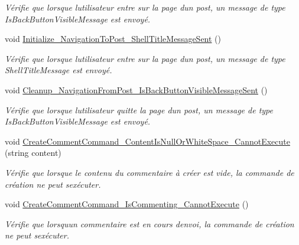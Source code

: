 \begin{DoxyCompactItemize}
\begin{DoxyCompactList}\small\item\em Vérifie que lorsque l\textquotesingle{}utilisateur entre sur la page d\textquotesingle{}un post, un message de type Is\+Back\+Button\+Visible\+Message est envoyé. \end{DoxyCompactList}\item 
void \hyperlink{class_boxes_1_1_tests_1_1_post_view_model_tests_ae7d3cf866da3b97ff3955d37f7b17009}{Initialize\+\_\+\+Navigation\+To\+Post\+\_\+\+Shell\+Title\+Message\+Sent} ()
\begin{DoxyCompactList}\small\item\em Vérifie que lorsque l\textquotesingle{}utilisateur entre sur la page d\textquotesingle{}un post, un message de type Shell\+Title\+Message est envoyé. \end{DoxyCompactList}\item 
void \hyperlink{class_boxes_1_1_tests_1_1_post_view_model_tests_a21eaaecb6199830671f2e48bd728067e}{Cleanup\+\_\+\+Navigation\+From\+Post\+\_\+\+Is\+Back\+Button\+Visible\+Message\+Sent} ()
\begin{DoxyCompactList}\small\item\em Vérifie que lorsque l\textquotesingle{}utilisateur quitte la page d\textquotesingle{}un post, un message de type Is\+Back\+Button\+Visible\+Message est envoyé. \end{DoxyCompactList}\item 
void \hyperlink{class_boxes_1_1_tests_1_1_post_view_model_tests_aa0ceb95f9e2278029dce52ec0f242504}{Create\+Comment\+Command\+\_\+\+Content\+Is\+Null\+Or\+White\+Space\+\_\+\+Cannot\+Execute} (string content)
\begin{DoxyCompactList}\small\item\em Vérifie que lorsque le contenu du commentaire à créer est vide, la commande de création ne peut s\textquotesingle{}exécuter. \end{DoxyCompactList}\item 
void \hyperlink{class_boxes_1_1_tests_1_1_post_view_model_tests_a7722bd829c99628c56386d67c602f767}{Create\+Comment\+Command\+\_\+\+Is\+Commenting\+\_\+\+Cannot\+Execute} ()
\begin{DoxyCompactList}\small\item\em Vérifie que lorsqu\textquotesingle{}un commentaire est en cours d\textquotesingle{}envoi, la commande de création ne peut s\textquotesingle{}exécuter. \end{DoxyCompactList}\item 

\end{DoxyCompactItemize}
